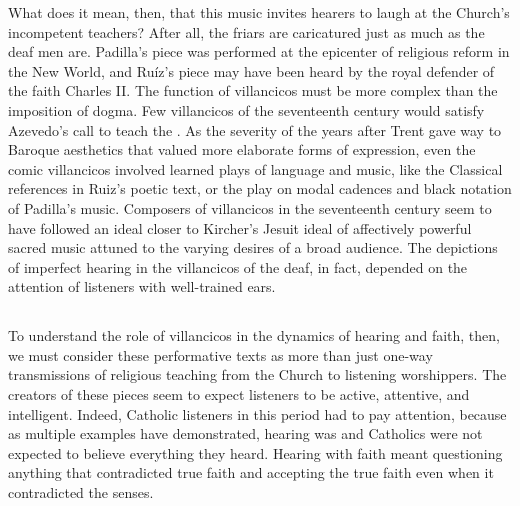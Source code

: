 What does it mean, then, that this music invites hearers to laugh at the
Church's incompetent teachers? 
After all, the friars are caricatured just as much as the deaf men are.
Padilla's piece was performed at the epicenter of religious reform in the New
World, and Ruíz's piece may have been heard by the royal defender of the faith
Charles II.  %
The function of villancicos must be more complex than the imposition of dogma.
Few villancicos of the seventeenth century would satisfy Azevedo's call to teach
the .  
As the severity of the years after Trent gave way to Baroque aesthetics that
valued more elaborate forms of expression, even the comic villancicos involved
learned plays of language and music, like the Classical references in Ruiz's
poetic text, or the play on modal cadences and black notation of Padilla's
music.
Composers of villancicos in the seventeenth century seem to have followed an
ideal closer to Kircher's Jesuit ideal of affectively powerful sacred music
attuned to the varying desires of a broad audience.
The depictions of imperfect hearing in the villancicos of the deaf, in fact,
depended on the attention of listeners with well-trained ears.


\subsection{}

To understand the role of villancicos in the dynamics of hearing and faith,
then, we must consider these performative texts as more than just one-way
transmissions of religious teaching from the Church to listening worshippers.
The creators of these pieces seem to expect listeners to be active, attentive,
and intelligent.
Indeed, Catholic listeners in this period had to pay attention, because as
multiple examples have demonstrated, hearing was  and Catholics were not expected to believe everything they heard.
Hearing with faith meant questioning anything that contradicted true faith and
accepting the true faith even when it contradicted the senses.

